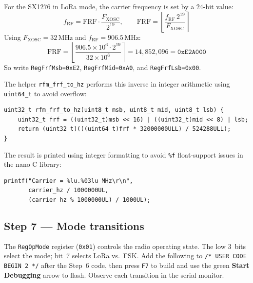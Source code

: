 \documentclass[11pt,letterpaper]{article}
\begin{document}
\begin{tcolorbox}[infobox={How to calculate \texttt{RegFrf*}}]
For the SX1276 in LoRa mode, the carrier frequency is set by a 24-bit value:
\[
f_{\mathrm{RF}} = \mathrm{FRF} \cdot \frac{F_{\mathrm{XOSC}}}{2^{19}},
\qquad
\mathrm{FRF} = \left\lfloor \frac{f_{\mathrm{RF}}\,2^{19}}{F_{\mathrm{XOSC}}} \right\rceil
\]
Using \(F_{\mathrm{XOSC}}=32\,\mathrm{MHz}\) and \(f_{\mathrm{RF}}=906.5\,\mathrm{MHz}\):
\[
\mathrm{FRF} = \left\lfloor \frac{906.5\times10^6\cdot2^{19}}{32\times10^6} \right\rceil
= 14{,}852{,}096 = \texttt{0xE2A000}
\]
So write \texttt{RegFrfMsb=0xE2}, \texttt{RegFrfMid=0xA0}, and \texttt{RegFrfLsb=0x00}.

\noindent The helper \texttt{rfm\_frf\_to\_hz} performs this inverse in integer arithmetic using \texttt{uint64\_t} to avoid overflow:
\begin{verbatim}
uint32_t rfm_frf_to_hz(uint8_t msb, uint8_t mid, uint8_t lsb) {
    uint32_t frf = ((uint32_t)msb << 16) | ((uint32_t)mid << 8) | lsb;
    return (uint32_t)(((uint64_t)frf * 32000000ULL) / 524288ULL);
}
\end{verbatim}
The result is printed using integer formatting to avoid \texttt{\%f} float-support issues in the nano C library:
\begin{verbatim}
printf("Carrier = %lu.%03lu MHz\r\n",
       carrier_hz / 1000000UL,
       (carrier_hz % 1000000UL) / 1000UL);
\end{verbatim}
\end{tcolorbox}

\subsection{Step 7 --- Mode transitions}
The \texttt{RegOpMode} register (\texttt{0x01}) controls the radio operating state. The low 3~bits select the mode; bit~7 selects LoRa vs.\ FSK. Add the following to \texttt{/* USER CODE BEGIN 2 */} after the Step~6 code, then press \texttt{F7} to build and use the green \textbf{Start Debugging} arrow to flash. Observe each transition in the serial monitor.
\end{document}
